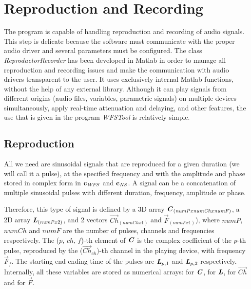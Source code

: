 \section{Reproduction and Recording}
The program is capable of handling reproduction and recording of audio signals. This step is delicate because the software must communicate with the proper audio driver and several parameters must be configured. The class \textit{ReproductorRecorder} has been developed in Matlab in order to manage all reproduction and recording issues and make the communication with audio drivers transparent to the user. It uses exclusively internal Matlab functions, without the help of any external library. Although it can play signals from different origins (audio files, variables, parametric signals) on multiple devices simultaneously, apply real-time attenuation and delaying, and other features, the use that is given in the program \textit{WFSTool} is relatively simple.

\subsection{Reproduction}
All we need are sinusoidal signals that are reproduced for a given duration (we will call it a pulse), at the specified frequency and with the amplitude and phase stored in complex form in $\coef[vec][WFS]$ and $\coef[vec][NS]$. A signal can be a concatenation of multiple sinusoidal pulses with different duration, frequency, amplitude or phase.


Therefore, this type of signal is defined by a 3D array $\bm{\mathit{C}}_{(\mathit{numP} \mathit{x} \mathit{numCh} x \mathit{numF})}$, a 2D array $\bm{\mathit{L}}_{(\mathit{numP} x 2)}$, and 2 vectors $\vec{Ch}_{(\mathit{numCh} x 1)}$ and $\vec{F}_{(\mathit{numF} x 1)}$), where $\mathit{numP}$, $\mathit{numCh}$ and $\mathit{numF}$ are the number of pulses, channels and frequencies respectively. The ($p$, $ch$, $f$)-th element of $\bm{\mathit{C}}$ is the complex coefficient of the $p$-th pulse, reproduced by the ($\vec{Ch}_{\mathit{ch}}$)-th channel in the playing device, with frequency $\vec{F}_f$. The starting end ending time of the pulses are $\bm{\mathit{L}}_{p, 1}$ and $\bm{\mathit{L}}_{p, 2}$ respectively. Internally, all these variables are stored as numerical arrays:  for $\bm{\mathit{C}}$,  for $\bm{\mathit{L}}$,  for $\vec{Ch}$ and  for $\vec{F}$.


